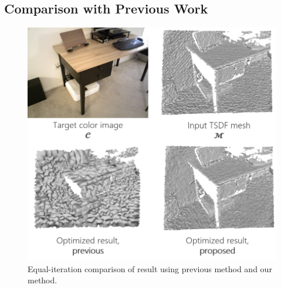 \subsection{Comparison with Previous Work}

\begin{figure}
    \includegraphics[width=\columnwidth]{figures/4_result_comparison_with_previous_method_simple.png}
    \caption{Equal-iteration comparison of result using previous method\cite{ravi2020accelerating} and our method. 
    }
    \label{fig:comparison_with_previous_method}
\end{figure}

